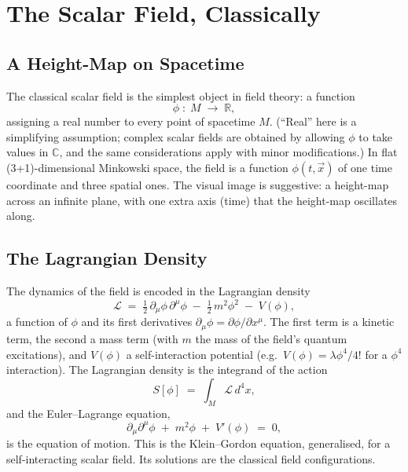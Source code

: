 \documentclass[11pt]{article}
\begin{document}
\section{The Scalar Field, Classically}
\label{sec:classical}

\subsection{A Height-Map on Spacetime}

The classical scalar field is the simplest object in field theory: a function
\[
\phi \;:\; M \;\to\; \mathbb{R},
\]
assigning a real number to every point of spacetime $M$. (``Real'' here is a simplifying assumption; complex scalar fields are obtained by allowing $\phi$ to take values in $\mathbb{C}$, and the same considerations apply with minor modifications.) In flat (3+1)-dimensional Minkowski space, the field is a function $\phi(t, \vec{x})$ of one time coordinate and three spatial ones. The visual image is suggestive: a height-map across an infinite plane, with one extra axis (time) that the height-map oscillates along.

\subsection{The Lagrangian Density}

The dynamics of the field is encoded in the Lagrangian density
\begin{equation}
\mathcal{L} \;=\; \tfrac{1}{2}\, \partial_\mu \phi \,\partial^\mu \phi \;-\; \tfrac{1}{2}\, m^2 \phi^2 \;-\; V(\phi),
\label{eq:lagrangian}
\end{equation}
a function of $\phi$ and its first derivatives $\partial_\mu \phi = \partial \phi / \partial x^\mu$. The first term is a kinetic term, the second a mass term (with $m$ the mass of the field's quantum excitations), and $V(\phi)$ a self-interaction potential (e.g.~$V(\phi) = \lambda \phi^4 / 4!$ for a $\phi^4$ interaction). The Lagrangian density is the integrand of the action
\begin{equation}
S[\phi] \;=\; \int_M \mathcal{L}\, d^4x,
\label{eq:action}
\end{equation}
and the Euler--Lagrange equation,
\begin{equation}
\partial_\mu \partial^\mu \phi \;+\; m^2 \phi \;+\; V'(\phi) \;=\; 0,
\label{eq:el}
\end{equation}
is the equation of motion. This is the Klein--Gordon equation, generalised, for a self-interacting scalar field. Its solutions are the classical field configurations.
\end{document}
